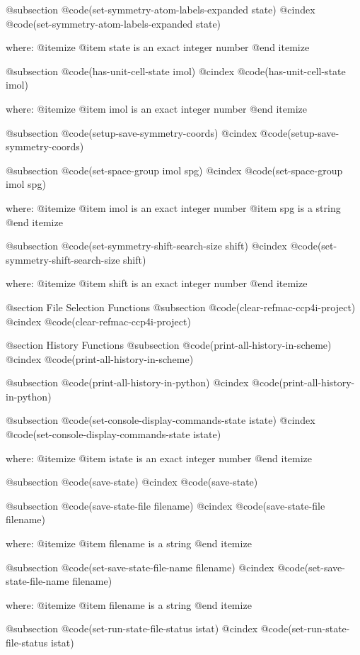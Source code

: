 @subsection @code{(set-symmetry-atom-labels-expanded state)}
@cindex @code{(set-symmetry-atom-labels-expanded state)}
 
where: 
 @itemize 
     @item state is an exact integer number
 @end itemize


@subsection @code{(has-unit-cell-state imol)}
@cindex @code{(has-unit-cell-state imol)}
 
where: 
 @itemize 
     @item imol is an exact integer number
 @end itemize


@subsection @code{(setup-save-symmetry-coords)}
@cindex @code{(setup-save-symmetry-coords)}
 
@subsection @code{(set-space-group imol spg)}
@cindex @code{(set-space-group imol spg)}
 
where: 
 @itemize 
     @item imol is an exact integer number
     @item spg is a string
 @end itemize


@subsection @code{(set-symmetry-shift-search-size shift)}
@cindex @code{(set-symmetry-shift-search-size shift)}
 
where: 
 @itemize 
     @item shift is an exact integer number
 @end itemize



@section File Selection Functions 
@subsection @code{(clear-refmac-ccp4i-project)}
@cindex @code{(clear-refmac-ccp4i-project)}
 

@section History Functions 
@subsection @code{(print-all-history-in-scheme)}
@cindex @code{(print-all-history-in-scheme)}
 
@subsection @code{(print-all-history-in-python)}
@cindex @code{(print-all-history-in-python)}
 
@subsection @code{(set-console-display-commands-state istate)}
@cindex @code{(set-console-display-commands-state istate)}
 
where: 
 @itemize 
     @item istate is an exact integer number
 @end itemize


@subsection @code{(save-state)}
@cindex @code{(save-state)}
 
@subsection @code{(save-state-file filename)}
@cindex @code{(save-state-file filename)}
 
where: 
 @itemize 
     @item filename is a string
 @end itemize


@subsection @code{(set-save-state-file-name filename)}
@cindex @code{(set-save-state-file-name filename)}
 
where: 
 @itemize 
     @item filename is a string
 @end itemize


@subsection @code{(set-run-state-file-status istat)}
@cindex @code{(set-run-state-file-status istat)}
 
